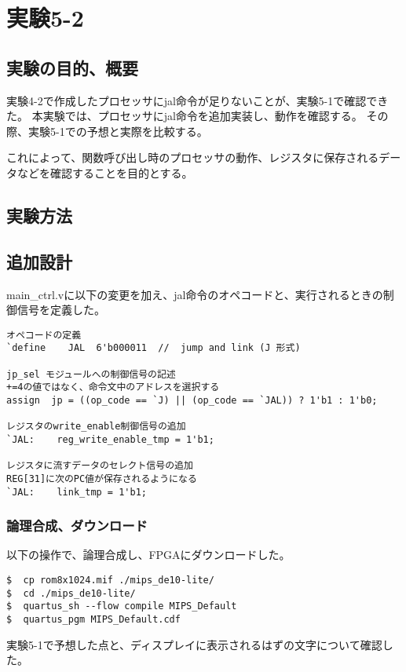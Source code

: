 \section{実験5-2}
\subsection{実験の目的、概要}
実験4-2で作成したプロセッサにjal命令が足りないことが、実験5-1で確認できた。
本実験では、プロセッサにjal命令を追加実装し、動作を確認する。
その際、実験5-1での予想と実際を比較する。

これによって、関数呼び出し時のプロセッサの動作、レジスタに保存されるデータなどを確認することを目的とする。

\subsection{実験方法}
\subsection{追加設計}
main\_ctrl.vに以下の変更を加え、jal命令のオペコードと、実行されるときの制御信号を定義した。
\begin{lstlisting}[caption={main\_ctrl.vの追加設計},label={mainctrl.vの追加設計5-2}]
オペコードの定義
`define    JAL  6'b000011  //  jump and link (J 形式)

jp_sel モジュールへの制御信号の記述
+=4の値ではなく、命令文中のアドレスを選択する
assign  jp = ((op_code == `J) || (op_code == `JAL)) ? 1'b1 : 1'b0;

レジスタのwrite_enable制御信号の追加
`JAL:    reg_write_enable_tmp = 1'b1;

レジスタに流すデータのセレクト信号の追加
REG[31]に次のPC値が保存されるようになる
`JAL:    link_tmp = 1'b1;
\end{lstlisting}

\subsubsection{論理合成、ダウンロード}
以下の操作で、論理合成し、FPGAにダウンロードした。
\begin{lstlisting}[caption={論理合成、ダウンロード},label={論理合成、ダウンロード5-2}]
$  cp rom8x1024.mif ./mips_de10-lite/
$  cd ./mips_de10-lite/
$  quartus_sh --flow compile MIPS_Default
$  quartus_pgm MIPS_Default.cdf
\end{lstlisting}

実験5-1で予想した点と、ディスプレイに表示されるはずの文字について確認した。

